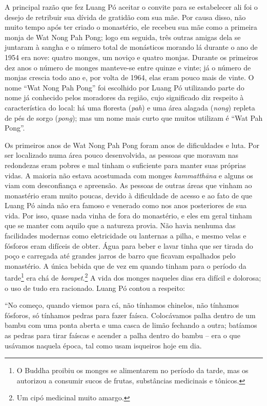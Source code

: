 A principal razão que fez Luang Pó aceitar o convite para se estabelecer
ali foi o desejo de retribuir sua dívida de gratidão com sua mãe. Por
causa disso, não muito tempo após ter criado o monastério, ele recebeu
sua mãe como a primeira monja de Wat Nong Pah Pong; logo em seguida,
três outras amigas dela se juntaram à sangha e o número total de
monásticos morando lá durante o ano de 1954 era nove: quatro monges, um
noviço e quatro monjas. Durante os primeiros dez anos o número de monges
manteve-se entre quinze e vinte; já o número de monjas crescia todo ano
e, por volta de 1964, elas eram pouco mais de vinte. O nome ``Wat Nong
Pah Pong'' foi escolhido por Luang Pó utilizando parte do nome já
conhecido pelos moradores da região, cujo significado diz respeito à
característica do local: há uma floresta (\emph{pah}) e uma área alagada
(\emph{nong}) repleta de pés de sorgo (\emph{pong}); mas um nome mais
curto que muitos utilizam é ``Wat Pah Pong''.

Os primeiros anos de Wat Nong Pah Pong foram anos de dificuldades e
luta. Por ser localizado numa área pouco desenvolvida, as pessoas que
moravam nas redondezas eram pobres e mal tinham o suficiente para manter
suas próprias vidas. A maioria não estava acostumada com monges
\emph{kammatthāna} e alguns os viam com desconfiança e apreensão. As
pessoas de outras áreas que vinham ao monastério eram muito poucas,
devido à dificuldade de acesso e ao fato de que Luang Pó ainda não era
famoso e venerado como nos anos posteriores de sua vida. Por isso, quase
nada vinha de fora do monastério, e eles em geral tinham que se manter
com aquilo que a natureza provia. Não havia nenhuma das facilidades
modernas como eletricidade ou lanternas a pilha, e mesmo velas e
fósforos eram difíceis de obter. Água para beber e lavar tinha que ser
tirada do poço e carregada até grandes jarros de barro que ficavam
espalhados pelo monastério. A única bebida que de vez em quando tinham
para o período da tarde\footnote{O Buddha proibiu os monges se
  alimentarem no período da tarde, mas os autorizou a consumir sucos de
  frutas, substâncias medicinais e tônicos.} era chá de
\emph{borapet}.\footnote{Um cipó medicinal muito amargo.} A vida dos
monges naqueles dias era difícil e dolorosa; o uso de tudo era
racionado. Luang Pó contou a respeito:

``No começo, quando viemos para cá, não tínhamos chinelos, não tínhamos
fósforos, só tínhamos pedras para fazer faísca. Colocávamos palha dentro
de um bambu com uma ponta aberta e uma casca de limão fechando a outra;
batíamos as pedras para tirar faíscas e acender a palha dentro do bambu
-- era o que usávamos naquela época, tal como usam isqueiros hoje em
dia.

